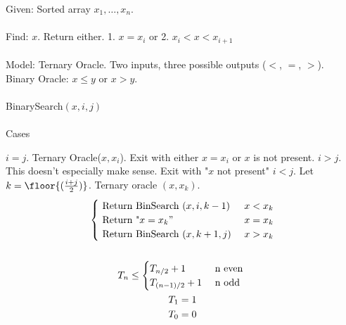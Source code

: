 \documentclass[class=scrartcl, crop=false]{standalone}
\begin{document}
Given: Sorted array $x_1, \dots, x_n$.
\\\\
Find: $x$. Return either. 1. $x = x_i$ or 2. $x_i < x < x_{i + 1}$ 
\\\\
Model: Ternary Oracle. Two inputs, three possible outputs ($<$, $=$, $>$).
\\
Binary Oracle: $x \leq y$ or $x > y$.
\\\\
BinarySearch$(x, i, j)$
\\\\
Cases
\begin{enumerate}
  \ii 
  $i = j$. Ternary Oracle($x, x_i$). Exit with either $x = x_i$ or $x$ is not present.
  \ii
  $i > j$. This doesn't especially make sense. Exit with "$x$ not present"
  \ii
  $i < j$. Let $k = \floor{(\frac{i + j}{2})}$. Ternary oracle $(x, x_k)$.
  \begin{gather*}
    \begin{cases}
      \ \text{Return BinSearch $(x, i, k - 1)$} \ & x < x_k \\
      \ \text{Return "$x = x_k"$} \ & x = x_k \\
      \ \text{Return BinSearch $(x, k + 1, j)$} \ & x > x_k \\
    \end{cases} 
    \\\\
    T_n \leq 
    \begin{cases}
      T_{n / 2} + 1 & \ \text{n even} \ \\
      T_{(n - 1) / 2} + 1 & \ \text{n odd} \
    \end{cases}  \\
    T_1 = 1 \\
    T_0 = 0
  \end{gather*} 
\end{enumerate} 
\end{document}
